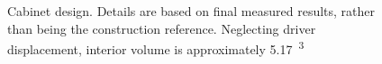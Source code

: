 \begin{figure}[h!]
\centering
{}
\qquad
{}
\caption{Cabinet design. Details are based on final measured results, rather than being the construction reference. Neglecting driver displacement, interior volume is approximately \SI{5.17}{\ft^3}}
\label{fig:sp_cad}
\end{figure}
%
